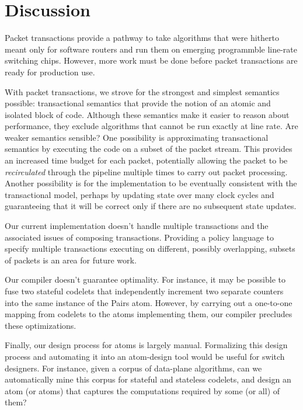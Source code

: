 \section{Discussion}
Packet transactions provide a pathway to take algorithms that were hitherto
meant only for software routers and run them on emerging programmble line-rate
switching chips. However, more work must be done before packet transactions
are ready for production use.

\begin{CompactEnumerate}
\item With packet transactions, we strove for the strongest and simplest
semantics possible: transactional semantics that provide the notion of an
atomic and isolated block of code. Although these semantics make it easier to
reason about performance, they exclude algorithms that cannot be run exactly at
line rate. Are weaker semantics sensible? One possibility is approximating
transactional semantics by executing the code on a subset of the packet stream.
This provides an increased time budget for each packet, potentially allowing
the packet to be {\em recirculated} through the pipeline multiple times to
carry out packet processing. Another possibility is for the implementation to
be eventually consistent with the transactional model, perhaps by updating
state over many clock cycles and guaranteeing that it will be correct only if
there are no subsequent state updates.
\item Our current implementation doesn't handle multiple transactions and the
associated issues of composing transactions. Providing a policy language to
specify multiple transactions executing on different, possibly overlapping,
subsets of packets is an area for future work.
\item Our compiler doesn't guarantee optimality. For instance, it may be
possible to fuse two stateful codelets that independently increment two
separate counters into the same instance of the Pairs atom. However, by
carrying out a one-to-one mapping from codelets to the atoms implementing them,
our compiler precludes these optimizations. 
\item Finally, our design process for atoms is largely manual.  Formalizing
this design process and automating it into an atom-design tool would be useful
for switch designers. For instance, given a corpus of data-plane algorithms,
can we automatically mine this corpus for stateful and stateless codelets, and
design an atom (or atoms) that captures the computations required by some (or
all) of them?
\end{CompactEnumerate}
